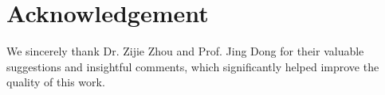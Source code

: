 \documentclass{article}
\begin{document}
\section*{Acknowledgement}
We sincerely thank Dr. Zijie Zhou and Prof. Jing Dong for their valuable suggestions and insightful comments, which significantly helped improve the quality of this work.







\newpage
\appendix

\end{document}
